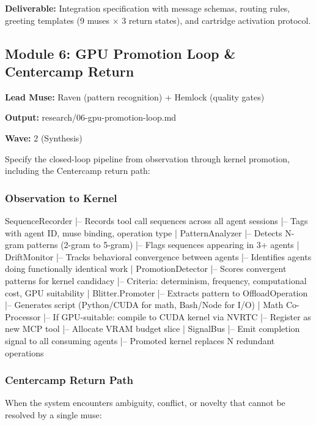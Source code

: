 \documentclass[11pt,letterpaper]{article}
\newcommand{\metafield}[2]{\textbf{\sffamily #1} #2\par}
\begin{document}
\textbf{Deliverable:} Integration specification with message schemas, routing rules, greeting templates (9 muses $\times$ 3 return states), and cartridge activation protocol.

\subsection{Module 6: GPU Promotion Loop \& Centercamp Return}

\metafield{Lead Muse:}{Raven (pattern recognition) + Hemlock (quality gates)}
\metafield{Output:}{research/06-gpu-promotion-loop.md}
\metafield{Wave:}{2 (Synthesis)}

Specify the closed-loop pipeline from observation through kernel promotion, including the Centercamp return path:

\subsubsection{Observation to Kernel}

\begin{asciibox}
SequenceRecorder
    |-- Records tool call sequences across all agent sessions
    |-- Tags with agent ID, muse binding, operation type
    |
PatternAnalyzer
    |-- Detects N-gram patterns (2-gram to 5-gram)
    |-- Flags sequences appearing in 3+ agents
    |
DriftMonitor
    |-- Tracks behavioral convergence between agents
    |-- Identifies agents doing functionally identical work
    |
PromotionDetector
    |-- Scores convergent patterns for kernel candidacy
    |-- Criteria: determinism, frequency, computational cost, GPU suitability
    |
Blitter.Promoter
    |-- Extracts pattern to OffloadOperation
    |-- Generates script (Python/CUDA for math, Bash/Node for I/O)
    |
Math Co-Processor
    |-- If GPU-suitable: compile to CUDA kernel via NVRTC
    |-- Register as new MCP tool
    |-- Allocate VRAM budget slice
    |
SignalBus
    |-- Emit completion signal to all consuming agents
    |-- Promoted kernel replaces N redundant operations
\end{asciibox}

\subsubsection{Centercamp Return Path}

When the system encounters ambiguity, conflict, or novelty that cannot be resolved by a single muse:
\end{document}
